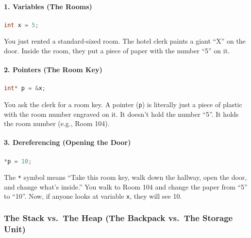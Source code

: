 \hypertarget{variables-the-rooms}{%
\paragraph{1. Variables (The Rooms)}\label{variables-the-rooms}}

\begin{lstlisting}[language={C++}]
int x = 5;
\end{lstlisting}

You just rented a standard-sized room. The hotel clerk paints a giant
``X'' on the door. Inside the room, they put a piece of paper with the
number ``5'' on it.

\hypertarget{pointers-the-room-key}{%
\paragraph{2. Pointers (The Room Key)}\label{pointers-the-room-key}}

\begin{lstlisting}[language={C++}]
int* p = &x;
\end{lstlisting}

You ask the clerk for a room key. A pointer
(\passthrough{\lstinline!p!}) is literally just a piece of plastic with
the room number engraved on it. It doesn't hold the number ``5''. It
holds the room number (e.g., Room 104).

\hypertarget{dereferencing-opening-the-door}{%
\paragraph{3. Dereferencing (Opening the
Door)}\label{dereferencing-opening-the-door}}

\begin{lstlisting}[language={C++}]
*p = 10;
\end{lstlisting}

The \passthrough{\lstinline!*!} symbol means ``Take this room key, walk
down the hallway, open the door, and change what's inside.'' You walk to
Room 104 and change the paper from ``5'' to ``10''. Now, if anyone looks
at variable \passthrough{\lstinline!x!}, they will see 10.

\hypertarget{the-stack-vs.-the-heap-the-backpack-vs.-the-storage-unit}{%
\subsubsection{The Stack vs.~The Heap (The Backpack vs.~The Storage
Unit)}\label{the-stack-vs.-the-heap-the-backpack-vs.-the-storage-unit}}


